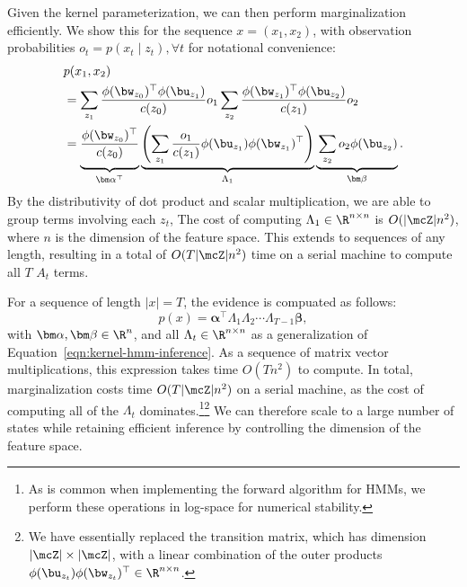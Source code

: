 Given the kernel parameterization, we can then perform marginalization efficiently. We show this for the sequence $x = (x_1,x_2)$, with observation probabilities $o_t = p(x_t \mid z_t), \forall t$ for notational convenience:
\begin{equation}
\label{eqn:kernel-hmm-inference}
\begin{aligned}
&p(x_1,x_2)\\
&= \sum_{z_1} \frac{\phi(\bw_{z_0})^\top\phi(\bu_{z_1})}{c(z_0)}
o_1\sum_{z_2}\frac{\phi(\bw_{z_1})^\top\phi(\bu_{z_2})}{c(z_1)}o_2\\
&= \underbrace{
    \vphantom{\left(\sum_{z_1} 
        \frac{o_1}{c(z_1)}\phi(\bu_{z_1})\phi(\bw_{z_1})^\top
        \right)}
    \frac{\phi(\bw_{z_0})^\top}{c(z_0)}
}_{\bm\alpha^\top}
\underbrace{\left(\sum_{z_1} 
\frac{o_1}{c(z_1)}\phi(\bu_{z_1})\phi(\bw_{z_1})^\top
\right)}_{\Lambda_1}
\underbrace{
    \vphantom{\left(\sum_{z_1} 
        \frac{o_1}{c(z_1)}\phi(\bu_{z_1})\phi(\bw_{z_1})^\top
        \right)}
    \sum_{z_2}o_2\phi(\bu_{z_2})
}_{\bm\beta}.
\end{aligned}
\end{equation}
By the distributivity of dot product and scalar multiplication, we are able to group terms involving each $z_t$,
The cost of computing $\Lambda_1\in\R^{n\times n}$ is $O(|\mcZ|n^2)$, where $n$ is the dimension of the feature space. This extends to sequences of any length, resulting in a total of $O(T|\mcZ|n^2)$ time on a serial machine to compute all $T$ $A_t$ terms.

For a sequence of length $|x|=T$, the evidence is compuated as follows:
\begin{equation}
    p(x) = \bm\alpha^\top \Lambda_1 \Lambda_2 \cdots \Lambda_{T-1}\bm\beta,
\end{equation}
with $\bm\alpha,\bm\beta\in\R^n$, and all $\Lambda_t\in\R^{n\times n}$
as a generalization of Equation~\ref{eqn:kernel-hmm-inference}.
As a sequence of matrix vector multiplications,
this expression takes time $O(Tn^2)$ to compute.
In total, marginalization costs time $O(T|\mcZ|n^2)$ on a serial machine,
as the cost of computing all of the $\Lambda_t$ dominates.\footnote{
As is common when implementing the forward algorithm for HMMs, we perform these operations in log-space for numerical stability.
}\footnote{
We have essentially replaced the transition matrix, which has dimension $|\mcZ|\times|\mcZ|$, with a linear combination of the outer products $\phi(\bu_{z_t})\phi(\bw_{z_t})^\top \in \R^{n \times n}$.
}
We can therefore scale to a large number of states while retaining efficient inference by controlling the dimension of the feature space.



